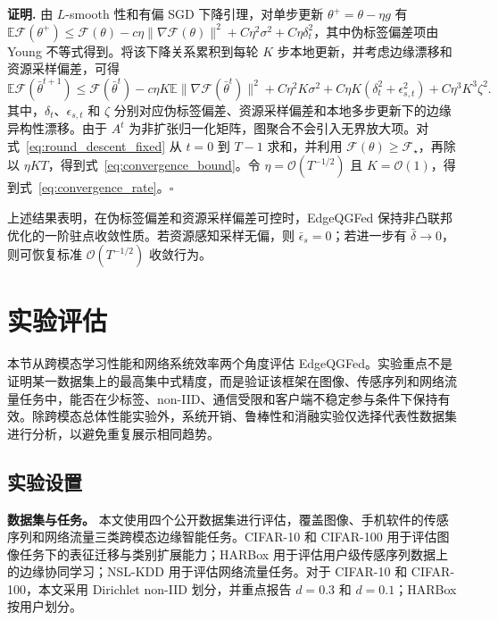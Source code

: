\documentclass[journal]{IEEEtran}
\begin{document}
\textbf{证明.}
由 $L$-smooth 性和有偏 SGD 下降引理，对单步更新 $\theta^+=\theta-\eta g$ 有
$\mathbb{E}\mathcal{F}(\theta^+)\le\mathcal{F}(\theta)-c\eta\|\nabla\mathcal{F}(\theta)\|^2+C\eta^2\sigma^2+C\eta\delta_t^2$，其中伪标签偏差项由 Young 不等式得到。将该下降关系累积到每轮 $K$ 步本地更新，并考虑边缘漂移和资源采样偏差，可得
\begin{equation}
    \mathbb{E}\mathcal{F}(\bar{\theta}^{t+1})
    \le
    \mathcal{F}(\bar{\theta}^{t})
    -c\eta K
    \mathbb{E}\|\nabla\mathcal{F}(\bar{\theta}^t)\|^2
    +C\eta^2K\sigma^2
    +C\eta K(\delta_t^2+\epsilon_{s,t}^2)
    +C\eta^3K^3\zeta^2 .
    \label{eq:round_descent_fixed}
\end{equation}
其中，$\delta_t$、$\epsilon_{s,t}$ 和 $\zeta$ 分别对应伪标签偏差、资源采样偏差和本地多步更新下的边缘异构性漂移。由于 $A^t$ 为非扩张归一化矩阵，图聚合不会引入无界放大项。对式~\eqref{eq:round_descent_fixed} 从 $t=0$ 到 $T-1$ 求和，并利用 $\mathcal{F}(\theta)\ge\mathcal{F}_\star$，再除以 $\eta KT$，得到式~\eqref{eq:convergence_bound}。令 $\eta=\mathcal{O}(T^{-1/2})$ 且 $K=\mathcal{O}(1)$，得到式~\eqref{eq:convergence_rate}。\hfill$\square$

上述结果表明，在伪标签偏差和资源采样偏差可控时，EdgeQGFed 保持非凸联邦优化的一阶驻点收敛性质。若资源感知采样无偏，则 $\bar{\epsilon}_s=0$；若进一步有 $\bar{\delta}\to0$，则可恢复标准 $\mathcal{O}(T^{-1/2})$ 收敛行为。

\section{实验评估}
\label{sec:evaluation}

本节从跨模态学习性能和网络系统效率两个角度评估 EdgeQGFed。实验重点不是证明某一数据集上的最高集中式精度，而是验证该框架在图像、传感序列和网络流量任务中，能否在少标签、non-IID、通信受限和客户端不稳定参与条件下保持有效。除跨模态总体性能实验外，系统开销、鲁棒性和消融实验仅选择代表性数据集进行分析，以避免重复展示相同趋势。

\subsection{实验设置}
\label{subsec:exp_setup}

\textbf{数据集与任务。}
本文使用四个公开数据集进行评估，覆盖图像、手机软件的传感序列和网络流量三类跨模态边缘智能任务。CIFAR-10 和 CIFAR-100 用于评估图像任务下的表征迁移与类别扩展能力；HARBox 用于评估用户级传感序列数据上的边缘协同学习；NSL-KDD 用于评估网络流量任务。对于 CIFAR-10 和 CIFAR-100，本文采用 Dirichlet non-IID 划分，并重点报告 $d=0.3$ 和 $d=0.1$；HARBox 按用户划分。 
\end{document}
